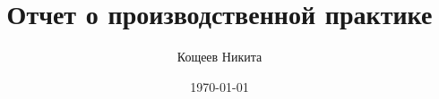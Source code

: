 \sloppy

\EqInChapter %
\TableInChapter %
\PicInChapter %

\author{Кощеев Никита}
\title{Отчет о производственной практике}
\date{\today}

\usepackage{pscyr}
\renewcommand{\rmdefault}{ftm}

\usepackage[
bookmarks=true, colorlinks=true, unicode=true,
urlcolor=black,linkcolor=black, anchorcolor=black,
citecolor=black, menucolor=black, filecolor=black,
]{hyperref}


\geometry{right=20mm}
\geometry{left=30mm}

\usepackage{enumerate}

\usepackage{multirow}

\usepackage{paralist,array}


\newcommand{\dimension}{\mathbb{R}^2}